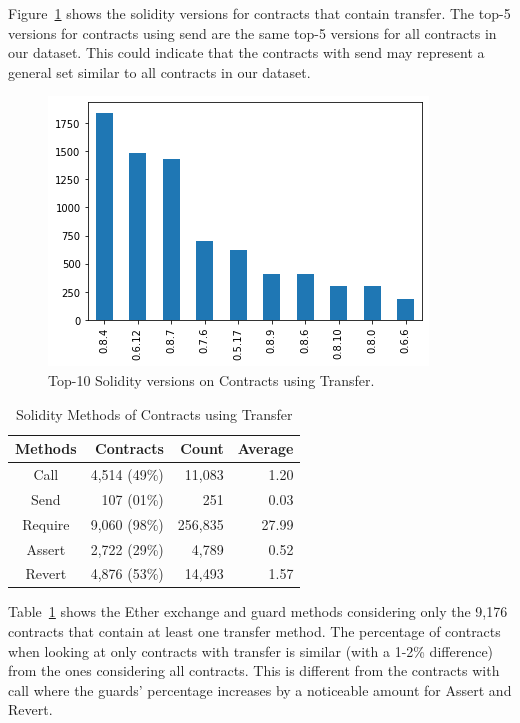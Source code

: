 \documentclass[10pt,conference]{IEEEtran}
\begin{document}
Figure~\ref{fig:transfer_version} shows the solidity versions for contracts that contain transfer.  The top-5 versions for contracts using send are the same top-5 versions for all contracts in our dataset.  This could indicate that the contracts with send may represent a general set similar to all contracts in our dataset.

\begin{figure}[h]
  \centering
  \includegraphics[width=\linewidth]{img/send_versions_clean.png}
  \caption{Top-10 Solidity versions on Contracts using Transfer.}
  \label{fig:transfer_version}
\end{figure}

\begin{table}
\center
  \caption{Solidity Methods of Contracts using Transfer}
  \label{tab:transfer}
  \begin{tabular}{crrr}
    \hline
    Methods & Contracts & Count & Average \\
    \hline
    Call & 4,514 (49\%) & 11,083 & 1.20\\
    Send &107 (01\%) & 251 & 0.03\\
    Require & 9,060 (98\%) &256,835 & 27.99\\
    Assert & 2,722 (29\%) & 4,789 & 0.52\\
    Revert & 4,876 (53\%) & 14,493 & 1.57 \\
    \hline
\end{tabular}
\end{table}


Table~\ref{tab:transfer} shows the Ether exchange and guard methods considering only the 9,176 contracts that contain at least one transfer method. The percentage of contracts when looking at only contracts with transfer is similar (with a 1-2\% difference) from the ones considering all contracts. This is different from the contracts with call where the guards' percentage increases by a noticeable amount for Assert and Revert.
\end{document}
